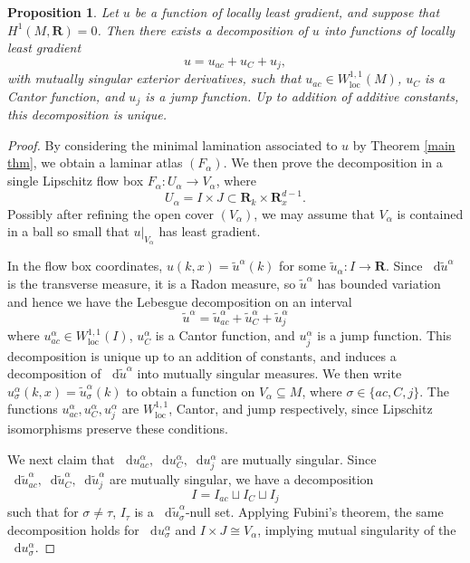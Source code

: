 \documentclass[reqno,11pt]{amsart}
\newcommand{\RR}{\mathbf{R}}
\newcommand*\dif{\mathop{}\!\mathrm{d}}
\newcommand{\loc}{\mathrm{loc}}
\newtheorem{proposition}[theorem]{Proposition}
\theoremstyle{definition}
\numberwithin{equation}{section}
\begin{document}
\begin{proposition}
Let $u$ be a function of locally least gradient, and suppose that $H^1(M, \RR) = 0$. Then there exists a decomposition of $u$ into functions of locally least gradient
$$u = u_{ac} + u_C + u_j,$$
with mutually singular exterior derivatives, such that $u_{ac} \in W^{1, 1}_\loc(M)$, $u_C$ is a Cantor function, and $u_j$ is a jump function.
Up to addition of additive constants, this decomposition is unique.
\end{proposition}
\begin{proof}
By considering the minimal lamination associated to $u$ by Theorem \ref{main thm}, we obtain a laminar atlas $(F_\alpha)$.
We then prove the decomposition in a single Lipschitz flow box $F_\alpha: U_\alpha \to V_\alpha$, where
$$U_\alpha = I \times J \subset \RR_k \times \RR^{d - 1}_x.$$
Possibly after refining the open cover $(V_\alpha)$, we may assume that $V_\alpha$ is contained in a ball so small that $u|_{V_\alpha}$ has least gradient.

In the flow box coordinates, $u(k, x) = \tilde u^\alpha(k)$ for some $\tilde u_\alpha: I \to \RR$. 
Since $\dif \tilde u^\alpha$ is the transverse measure, it is a Radon measure, so $\tilde u^\alpha$ has bounded variation and hence we have the Lebesgue decomposition on an interval \cite[Corollary 3.33]{Ambrosio2000FunctionsOB} 
$$\tilde u^\alpha = \tilde u^\alpha_{ac} + \tilde u^\alpha_C + \tilde u^\alpha_j$$
where $u^\alpha_{ac} \in W^{1, 1}_\loc(I)$, $u^\alpha_C$ is a Cantor function, and $u_j^\alpha$ is a jump function.
This decomposition is unique up to an addition of constants, and induces a decomposition of $\dif \tilde u^\alpha$ into mutually singular measures.
We then write $u^\alpha_\sigma(k, x) = \tilde u^\alpha_\sigma(k)$ to obtain a function on $V_\alpha \subseteq M$, where $\sigma \in \{ac, C, j\}$.
The functions $u^\alpha_{ac}, u^\alpha_C, u^\alpha_j$ are $W^{1,1}_\loc$, Cantor, and jump respectively, since Lipschitz isomorphisms preserve these conditions.

We next claim that $\dif u^\alpha_{ac}, \dif u^\alpha_C, \dif u^\alpha_j$ are mutually singular.
Since $\dif \tilde u^\alpha_{ac}, \dif \tilde u^\alpha_C, \dif \tilde u^\alpha_j$ are mutually singular, we have a decomposition
$$I = I_{ac} \sqcup I_C \sqcup I_j$$
such that for $\sigma \neq \tau$, $I_\tau$ is a $\dif \tilde u^\alpha_\sigma$-null set.
Applying Fubini's theorem, the same decomposition holds for $\dif u^\alpha_\sigma$ and $I \times J \cong V_\alpha$, implying mutual singularity of the $\dif u^\alpha_\sigma$.


\end{proof}
\end{document}
